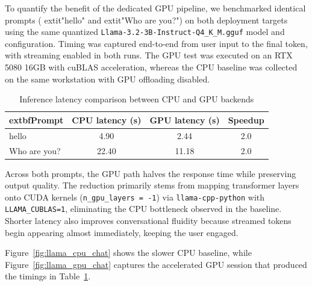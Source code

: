 \documentclass[12pt,a4paper]{article}
\begin{document}
To quantify the benefit of the dedicated GPU pipeline, we benchmarked identical prompts (	extit{"hello"} and 	extit{"Who are you?"}) on both deployment targets using the same quantized \texttt{Llama-3.2-3B-Instruct-Q4\_K\_M.gguf} model and configuration. Timing was captured end-to-end from user input to the final token, with streaming enabled in both runs. The GPU test was executed on an RTX 5080 16GB with cuBLAS acceleration, whereas the CPU baseline was collected on the same workstation with GPU offloading disabled.

\begin{table}[H]
    \centering
    \caption{Inference latency comparison between CPU and GPU backends}
    \label{tab:cpu_gpu_latency}
    \begin{tabular}{|l|c|c|c|}
        \hline
        	extbf{Prompt} & \textbf{CPU latency (s)} & \textbf{GPU latency (s)} & \textbf{Speedup} \\
        \hline
        hello & 4.90 & 2.44 & 2.0\texttimes{} \\
        Who are you? & 22.40 & 11.18 & 2.0\texttimes{} \\
        \hline
    \end{tabular}
\end{table}

Across both prompts, the GPU path halves the response time while preserving output quality. The reduction primarily stems from mapping transformer layers onto CUDA kernels (\texttt{n\_gpu\_layers = -1}) via \texttt{llama-cpp-python} with \texttt{LLAMA\_CUBLAS=1}, eliminating the CPU bottleneck observed in the baseline. Shorter latency also improves conversational fluidity because streamed tokens begin appearing almost immediately, keeping the user engaged.

Figure~\ref{fig:llama_cpu_chat} shows the slower CPU baseline, while Figure~\ref{fig:llama_gpu_chat} captures the accelerated GPU session that produced the timings in Table~\ref{tab:cpu_gpu_latency}.
\end{document}
